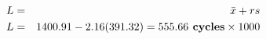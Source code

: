 \documentclass[12pt]{article}
\begin{document}
\pagestyle{empty}
\Large
{}
\pagecolor{ehandbook}

\boldmath
\begin{eqnarray*} 
  L & = & \bar{x} + r s \\
  L & = & 1400.91 - 2.16(391.32) = 555.66 \mbox{\bf{ cycles}} \times 1000
\end{eqnarray*}
\end{document}
